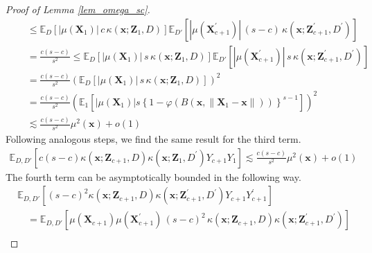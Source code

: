 \documentclass[letterpaper,10pt]{article}
\numberwithin{equation}{section}
\numberwithin{thm}{section}
\numberwithin{lem}{section}
\numberwithin{cor}{section}
\newcommand{\E}{\mathbb{E}}
\newcommand{\1}{\mathbbm{1}}
\begin{document}
\begin{proof}[Proof of Lemma \ref{lem_omega_sc}]
\begin{equation}
\begin{aligned}
			 & \quad \leq \E_{D}\left[|\mu(\mathbf{X}_1)| \, c \, \kappa\left(\mathbf{x}; \mathbf{Z}_{1}, D\right)\right]
			\E_{D'}\left[|\mu(\mathbf{X}_{c+1}^{\prime})| \, (s-c) \, \kappa\left(\mathbf{x}; \mathbf{Z}_{c+1}^{\prime}, D^{\prime}\right)\right]                                                                               \\
			 & \quad = \frac{c (s-c)}{s^2} \leq \E_{D}\left[|\mu(\mathbf{X}_1)| \, s \, \kappa\left(\mathbf{x}; \mathbf{Z}_{1}, D\right)\right]
			\E_{D'}\left[|\mu(\mathbf{X}_{c+1}^{\prime})| \, s \, \kappa\left(\mathbf{x}; \mathbf{Z}_{c+1}^{\prime}, D^{\prime}\right)\right]                                                                                   \\
			 & \quad = \frac{c (s-c)}{s^2} \left(\E_{D}\left[|\mu(\mathbf{X}_1)| \, s \, \kappa\left(\mathbf{x}; \mathbf{Z}_{1}, D\right)\right]\right)^2                                                                       \\
			 & \quad = \frac{c (s-c)}{s^2} \left(\E_{1}\left[|\mu(\mathbf{X}_1)| s\left\{1 - \varphi\left(B\left(\mathbf{x}, \|\mathbf{X}_1 - \mathbf{x}\|\right)\right)\right\}^{s-1}\right]\right)^2                          \\
			 & \quad \lesssim \frac{c(s-c)}{s^2}\mu^2(\mathbf{x}) + o(1)
		\end{aligned}
	\end{equation}
	Following analogous steps, we find the same result for the third term.
	\begin{equation}
		\begin{aligned}
			\E_{D, D'}\left[c(s-c) \kappa\left(\mathbf{x}; \mathbf{Z}_{c+1}, D\right)\kappa\left(\mathbf{x}; \mathbf{Z}_{1}, D^{\prime}\right)Y_{c+1}Y_{1}\right]
			\lesssim \frac{c(s-c)}{s^2}\mu^2(\mathbf{x}) + o(1)
		\end{aligned}
	\end{equation}
	The fourth term can be asymptotically bounded in the following way.
	\begin{equation}
		\begin{aligned}
			 & \E_{D, D'}\left[(s-c)^2 \kappa\left(\mathbf{x}; \mathbf{Z}_{c+1}, D\right)\kappa\left(\mathbf{x}; \mathbf{Z}_{c+1}^{\prime}, D^{\prime}\right)Y_{c+1}Y_{c+1}^{\prime}\right]                                           \\
			 & \quad = \E_{D, D'}\left[\mu(\mathbf{X}_{c+1})\mu(\mathbf{X}_{c+1}^{\prime})\, (s-c)^2 \, \kappa\left(\mathbf{x}; \mathbf{Z}_{c+1}, D\right)\kappa\left(\mathbf{x}; \mathbf{Z}_{c+1}^{\prime}, D^{\prime}\right)\right] \\

\end{aligned}
\end{equation}
\end{proof}
\end{document}
